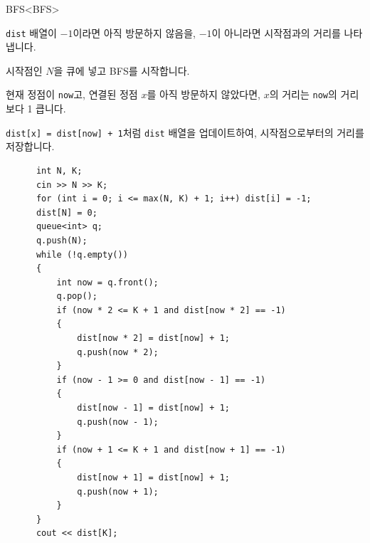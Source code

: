 \begin{frame}[fragile]{BFS}{<BFS>}
  \begin{twocol}
    \texttt{dist} 배열이 $-1$이라면 아직 방문하지 않음을, $-1$이 아니라면 시작점과의
    거리를 나타냅니다.\par\vspace{2mm}
    시작점인 $N$을 큐에 넣고 BFS를 시작합니다.\par\vspace{2mm}
    현재 정점이 \texttt{now}고, 연결된 정점 $x$를 아직 방문하지 않았다면, $x$의 거리는
    \texttt{now}의 거리보다 1 큽니다.\par\vspace{2mm}
    \texttt{dist[x] = dist[now] + 1}처럼 \texttt{dist} 배열을 업데이트하여, 시작점으로부터의
    거리를 저장합니다.
  \colsplit
    \begin{verbatim}
      int N, K;
      cin >> N >> K;
      for (int i = 0; i <= max(N, K) + 1; i++) dist[i] = -1;
      dist[N] = 0;
      queue<int> q;
      q.push(N);
      while (!q.empty())
      {
          int now = q.front();
          q.pop();
          if (now * 2 <= K + 1 and dist[now * 2] == -1)
          {
              dist[now * 2] = dist[now] + 1;
              q.push(now * 2);
          }
          if (now - 1 >= 0 and dist[now - 1] == -1)
          {
              dist[now - 1] = dist[now] + 1;
              q.push(now - 1);
          }
          if (now + 1 <= K + 1 and dist[now + 1] == -1)
          {
              dist[now + 1] = dist[now] + 1;
              q.push(now + 1);
          }
      }
      cout << dist[K];
    \end{verbatim}
  \end{twocol}
\end{frame}


